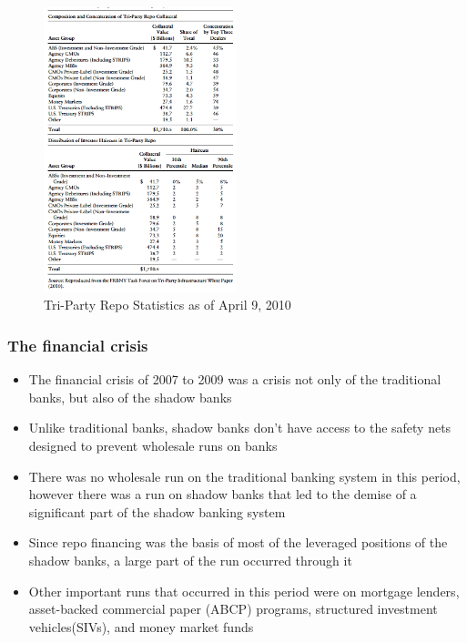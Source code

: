\documentclass[11pt]{beamer}
\begin{document}
\begin{frame}
\begin{figure}
\includegraphics[width=0.5\textwidth]{11_6.png}
\caption{Tri-Party Repo Statistics as of April 9, 2010}
\end{figure}
\end{frame}

\begin{frame}
\frametitle{The financial crisis}
\begin{itemize}
\item The financial crisis of 2007 to 2009 was a crisis not only of the traditional banks, but also of the shadow banks
\item Unlike traditional banks, shadow banks don't have access to the safety nets designed to prevent wholesale runs on banks
\item There was no wholesale run on the traditional banking system in this period, however there was a run on shadow banks that led to the demise of a significant part of the shadow banking system
\item  Since repo financing was the basis of most of the leveraged positions of the shadow banks, a large part of the run occurred through it
\item Other important runs that occurred in this period were on mortgage lenders, asset-backed commercial paper (ABCP) programs, structured investment vehicles(SIVs), and money market funds
\end{itemize}
\end{frame}
\end{document}
